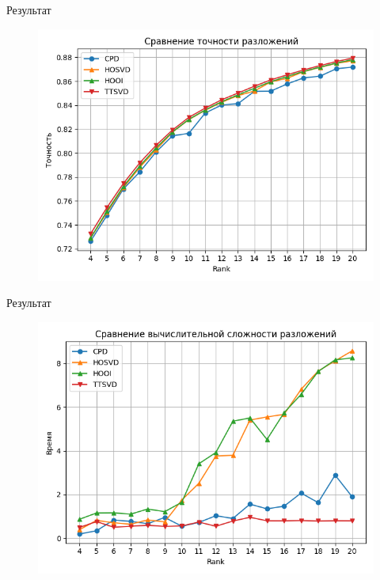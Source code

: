 \documentclass{beamer}
\begin{document}

\begin{frame}{Результат}

    \begin{figure}
        \centering
        \includegraphics[width = \textwidth]{images/precision.png}
    \end{figure}
  
\end{frame}


\begin{frame}{Результат}

    \begin{figure}
        \centering
        \includegraphics[width = \textwidth]{images/time.png}
    \end{figure}

\end{frame}
\end{document}
